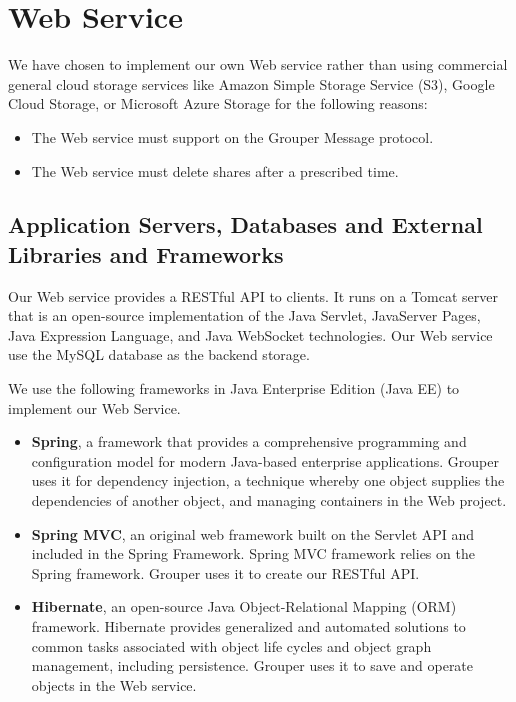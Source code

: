 \documentclass[a4paper,11pt]{report}
\begin{document}
\section{Web Service} \label{section:web_service}

We have chosen to implement our own Web service rather than using commercial general cloud storage services like Amazon Simple Storage Service (S3), Google Cloud Storage, or Microsoft Azure Storage for the following reasons:

\begin{itemize}[leftmargin=7mm]
	\setlength{\itemsep}{1pt}
	\setlength{\parskip}{0pt}
	\setlength{\parsep}{0pt}
	\item The Web service must support on the Grouper Message protocol.
	\item The Web service must delete shares after a prescribed time.
\end{itemize}

\subsection{Application Servers, Databases and External Libraries and Frameworks} \label{subsection:dependencies_client}

Our Web service provides a RESTful API to clients.
It runs on a Tomcat server\cite{tomcat} that is an open-source implementation of the Java Servlet, JavaServer Pages, Java Expression Language, and Java WebSocket technologies.
Our Web service use the MySQL\cite{mysql} database as the backend storage.

We use the following frameworks in Java Enterprise Edition (Java EE) to implement our Web Service.

\begin{itemize}[leftmargin=7mm]
	\setlength{\itemsep}{1pt}
	\setlength{\parskip}{0pt}
	\setlength{\parsep}{0pt}
	\item 
	\textbf{Spring}\cite{spring}, a framework that provides a comprehensive programming and configuration model for modern Java-based enterprise applications.
	Grouper uses it for dependency injection, a technique whereby one object supplies the dependencies of another object, and managing containers in the Web project.
	\item 
	\textbf{Spring MVC}\cite{spring}, an original web framework built on the Servlet API and included in the Spring Framework.
	Spring MVC framework relies on the Spring framework.
	Grouper uses it to create our RESTful API.
	\item 
	\textbf{Hibernate}\cite{hibernate}, an open-source Java Object-Relational Mapping (ORM) framework.
	Hibernate provides generalized and automated solutions to common tasks associated with object life cycles and object graph management, including persistence. 
	Grouper uses it to save and operate objects in the Web service.
\end{itemize}
\end{document}
